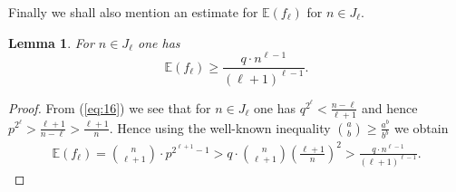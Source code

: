 \documentclass[10pt,a4paper]{amsart}
\newtheorem{lema}{Lemma}
\newcommand{\E}{\mathbb{E}}
\begin{document}


Finally we shall also mention an estimate for $\E(f_\ell)$ for $n\in J_\ell$. 
\begin{lema}
For $n\in J_\ell$ one has 
$$\E(f_\ell)\ge  \frac{q \cdot n^{\ell-1}}{(\ell+1)^{\ell-1}}.$$
\end{lema}
\begin{proof}
From (\ref{eq:16}) we see that for $n\in J_\ell$ one has $q^{2^{\ell}}<\frac{n-\ell}{\ell+1}$ and hence $p^{2^{\ell}}>\frac{\ell+1}{n-\ell}>\frac{\ell+1}{n}$. Hence using the well-known inequality $\binom a b \ge \frac{a^b}{b^b}$ we obtain
\begin{eqnarray*}\label{ineq:29}
\E(f_\ell) =\binom n {\ell+1} \cdot p^{2^{\ell+1}-1} > q \cdot \binom n {\ell+1}\left(\frac{\ell+1}{n}\right)^2>   \frac{q \cdot n^{\ell-1}}{(\ell+1)^{\ell-1}}. 
\end{eqnarray*}
\end{proof}




\end{document}
